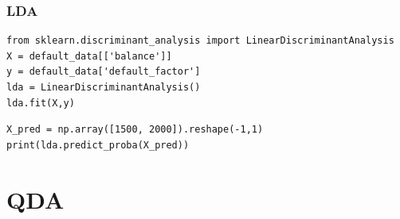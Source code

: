 
\begin{frame}[fragile]\frametitle{LDA }
\tiny
\begin{lstlisting}
from sklearn.discriminant_analysis import LinearDiscriminantAnalysis
X = default_data[['balance']]
y = default_data['default_factor']
lda = LinearDiscriminantAnalysis()
lda.fit(X,y)
\end{lstlisting}
\pause
\begin{lstlisting}
X_pred = np.array([1500, 2000]).reshape(-1,1)
print(lda.predict_proba(X_pred))
\end{lstlisting}


\end{frame}

\section{QDA}

